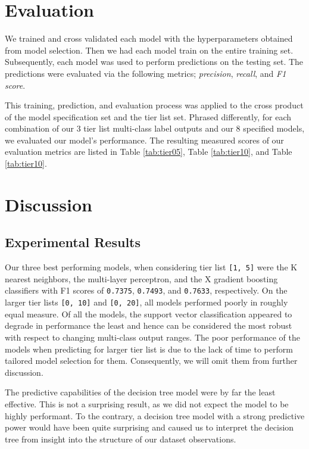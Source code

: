 \documentclass[12pt]{diazessay}
\begin{document}
\section{Evaluation}

We trained and cross validated each model with the hyperparameters obtained from model selection.
Then we had each model train on the entire training set.
Subsequently, each model was used to perform predictions on the testing set.
The predictions were evaluated via the following metrics; \emph{precision}, \emph{recall}, and \emph{F1 score}.

This training, prediction, and evaluation process was applied to the cross product of the model specification set and the tier list set.
Phrased differently, for each combination of our $3$ tier list multi-class label outputs and our $8$ specified models, we evaluated our model's performance.
The resulting measured scores of our evaluation metrics are listed in Table \ref{tab:tier05}, Table \ref{tab:tier10}, and Table \ref{tab:tier10}.


\section{Discussion}

\subsection{Experimental Results}

Our three best performing models, when considering tier list \texttt{[1, 5]} were the K nearest neighbors, the multi-layer perceptron, and the X gradient boosting classifiers with F1 scores of \texttt{0.7375}, \texttt{0.7493}, and \texttt{0.7633}, respectively.
On the larger tier lists \texttt{[0, 10]} and \texttt{[0, 20]}, all models performed poorly in roughly equal measure.
Of all the models, the support vector classification appeared to degrade in performance the least and hence can be considered the most robust with respect to changing multi-class output ranges.
The poor performance of the models when predicting for larger tier list is due to the lack of time to perform tailored model selection for them.
Consequently, we will omit them from further discussion.

The predictive capabilities of the decision tree model were by far the least effective.
This is not a surprising result, as we did not expect the model to be highly performant.
To the contrary, a decision tree model with a strong predictive power would have been quite surprising and caused us to interpret the decision tree from insight into the structure of our dataset observations.
\end{document}
